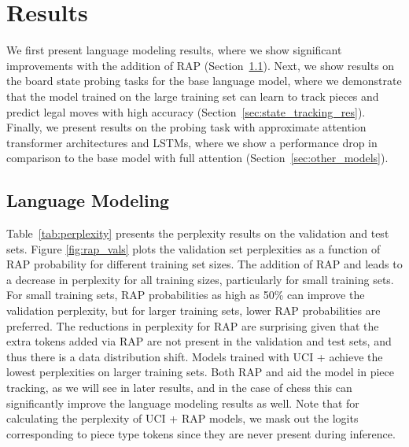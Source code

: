 \section{Results}
We first present language modeling results, where we show significant 
improvements with the addition of RAP (Section~\ref{sec:perplexity_res}). 
Next, we show results on the board state probing tasks for the base language model, where we demonstrate that the 
model trained on the large training set can learn to track pieces and predict legal moves with high accuracy (Section~\ref{sec:state_tracking_res}).
Finally, we present results on the probing task 
with approximate attention transformer architectures and LSTMs,  where we show a performance drop in comparison to the base model with full attention (Section~\ref{sec:other_models}).



\subsection{Language Modeling}
\label{sec:perplexity_res}
Table~\ref{tab:perplexity} presents the perplexity results on the validation and test sets.  
Figure \ref{fig:rap_vals} plots the validation set perplexities as a function of RAP probability for different training set sizes. 
The addition of RAP and \piecetype leads to a decrease in perplexity for all training sizes, particularly for small training sets.
For small training sets, RAP probabilities as high as 50\% can improve the validation perplexity, but for larger training sets, lower RAP probabilities are preferred. 
The reductions in perplexity for RAP are surprising given that the extra tokens added via RAP are not present in the validation and test sets, and thus there is a data distribution shift. %
Models trained with UCI + \piecetype achieve the lowest perplexities on larger training sets. 
Both RAP and \piecetype aid the model in piece tracking, as we will see in later results, and in the case of chess this can significantly improve the language modeling results as well.
Note that for calculating the perplexity of UCI + RAP models, we mask out the logits corresponding to piece type tokens since they are never present during inference. 



